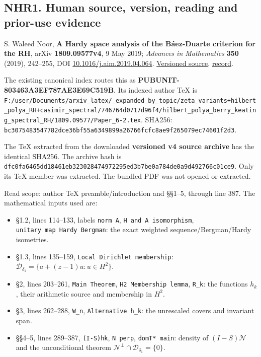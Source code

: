 \subsection{NHR1. Human source, version, reading and prior-use
evidence}\label{nhr1.-human-source-version-reading-and-prior-use-evidence}

S. Waleed Noor, \textbf{A Hardy space analysis of the Báez-Duarte
criterion for the RH}, arXiv \textbf{1809.09577v4}, 9 May 2019;
\emph{Advances in Mathematics} \textbf{350} (2019), 242--255, DOI
\href{https://doi.org/10.1016/j.aim.2019.04.064}{10.1016/j.aim.2019.04.064}.
\href{https://arxiv.org/src/1809.09577v4}{Versioned source},
\href{https://arxiv.org/abs/1809.09577v4}{record}.

The existing canonical index routes this as
\textbf{PUBUNIT-803463A3EF787AE3E69C519B}. Its indexed author TeX is
\nolinkurl{F:/user/Documents/arxiv_latex/_expanded_by_topic/zeta_variants+hilbert_polya_RH+casimir_spectral/746764d0717d96f4/hilbert_polya_berry_keating_spectral_RH/1809.09577/Paper_6-2.tex}.
SHA256:
\nolinkurl{bc3075483547782dce36bf55a6349899a26766fcfc8ae9f265079ec74601f2d3}.

The TeX extracted from the downloaded \textbf{versioned v4 source
archive} has the identical SHA256. The archive hash is
\nolinkurl{dfc0fa6465dd18461eb323028474972295ed3b7be0a784de0a9d492766c01ce9}.
Only its TeX member was extracted. The bundled PDF was not opened or
extracted.

Read scope: author TeX preamble/introduction and §§1--5, through line
387. The mathematical inputs used are:

\begin{itemize}
\tightlist
\item
  §1.2, lines 114--133, labels \texttt{norm\ A},
  \texttt{H\ and\ A\ isomorphism},
  \texttt{unitary\ map\ Hardy\ Bergman}: the exact weighted
  sequence/Bergman/Hardy isometries.
\item
  §1.3, lines 135--159, \texttt{Local\ Dirichlet\ membership}:
  \(\mathcal D_{\delta_1}=\{a+(z-1)u:u\in H^2\}\).
\item
  §2, lines 203--261, \texttt{Main\ Theorem},
  \texttt{H2\ Membership\ lemma}, \texttt{R\_k}: the functions \(h_k\),
  their arithmetic source and membership in \(H^2\).
\item
  §3, lines 262--288, \texttt{W\_n}, \texttt{Alternative\ h\_k}: the
  unrescaled covers and invariant span.
\item
  §§4--5, lines 289--387, \texttt{(I-S)hk}, \texttt{N\ perp},
  \texttt{domT*\ main}: density of \((I-S)\mathcal N\) and the
  unconditional theorem
  \(\mathcal N^\perp\cap\mathcal D_{\delta_1}=\{0\}\).
\end{itemize}

